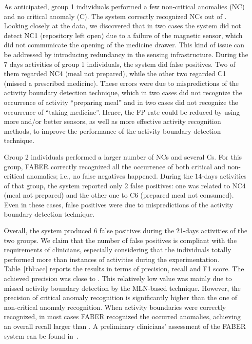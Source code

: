 \documentclass[10pt, conference, compsocconf]{IEEEtran}
\begin{document}
As anticipated, group 1 individuals performed a few non-critical anomalies
(NC) and no critical anomaly (C). The system correctly recognized  NCs
out of . Looking closely at the data, we discovered that in two cases the
system did not detect NC1 (repository left open) due to a failure of the
magnetic sensor, which did not communicate the opening of the medicine 
drawer. This kind of issue can be addressed by introducing redundancy in
the sensing infrastructure. 
During the 7 days activities of group 1 individuals, the system
did  false positives. Two of them regarded NC4 (meal not prepared), while
the other two regarded C1 (missed a prescribed medicine). These errors were 
due to mispredictions of the activity boundary detection technique, which
in two cases did not recognize the occurrence of activity ``preparing meal''
and in two cases did not recognize the occurrence of ``taking medicine''. 
Hence, the FP rate could be reduced by using more and/or better sensors,
as well as more effective activity recognition methods, to
improve the performance of the activity boundary detection technique.

Group 2 individuals performed a larger number of NCs and several Cs.
For this group, FABER correctly recognized all the occurrence of both
critical and non-critical anomalies; i.e., no false negatives happened. 
During the 14-days activities of that group, the system reported only 2 false 
positives: one was related to NC4 (meal not prepared) and the other one 
to C6 (prepared meal not consumed). Even in these cases, false positives 
were due to mispredictions of the activity boundary detection technique. 

Overall, the system produced 6 false positives during the 21-days activities
of the two groups. We claim that the number of false positives is compliant 
with the requirements of clinicians, especially considering that the 
individuals totally performed more than  instances of activities 
during the experimentation.
Table~\ref{tbl:acc} reports the results in terms of precision, recall
and F1 score. The achieved precision was close to . This relatively low 
value was mainly due to missed activity boundary detection by the MLN-based 
technique. However, the precision of critical anomaly
recognition is significantly higher than the one of non-critical anomaly
recognition. 
When activity boundaries were correctly recognized, in most cases FABER 
recognized the occurred anomalies, achieving an overall recall
larger than .
A preliminary clinicians' assessment of the FABER system can be found
in~\cite{smarte15}.
\end{document}
